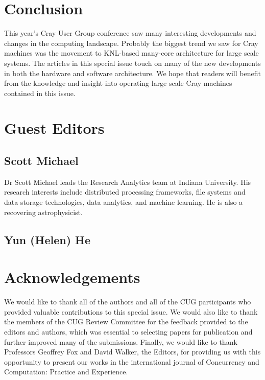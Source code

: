 \documentclass[AMA,LATO1COL,demo]{WileyNJD-v2}
\begin{document}
\section{Conclusion}\label{sec:conclusion}

This year's Cray User Group conference saw many interesting developments and changes in
the computing landscape. Probably the biggest trend we saw for Cray machines was the
movement to KNL-based many-core architecture for large scale systems. The articles in this
special issue touch on many of the new developments in both the hardware and software
architecture. We hope that readers will benefit from the knowledge and insight into
operating large scale Cray machines contained in this issue.

\section{Guest Editors}\label{sec:editors}
\subsection{Scott Michael}\label{sec:scott}
Dr Scott Michael leads the Research Analytics team at Indiana University. His research interests include distributed processing frameworks, file systems and data storage technologies, data analytics, and machine learning. He is also a recovering astrophysicist. 
\subsection{Yun (Helen) He}\label{sec:helen}

\section{Acknowledgements}\label{sec:acknowledge}

We would like to thank all of the authors and all of the CUG participants who provided valuable contributions to this
special issue. We would also like to thank the members of the CUG Review Committee for the feedback provided to
the editors and authors, which was essential to selecting papers for publication and further improved many of the submissions. Finally, we would like to
thank Professors Geoffrey Fox and David Walker, the Editors, for
providing us with this opportunity to present our works in the international
journal of Concurrency and Computation: Practice and Experience.



\end{document}
